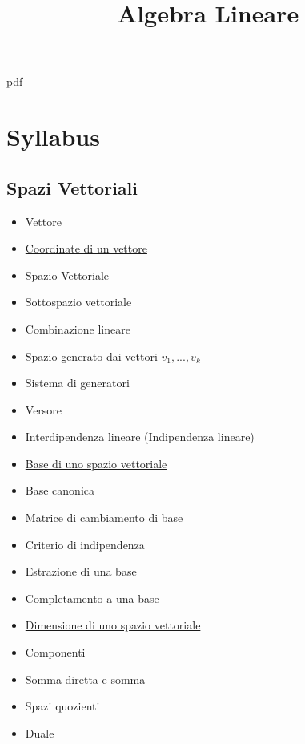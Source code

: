 \documentclass[a4paper,10pt]{article}
\title{Algebra Lineare}
\begin{document}
\maketitle
\href{AlgebraLineare.pdf}{pdf} 
\section*{Syllabus}
\subsection{Spazi Vettoriali}
\begin{itemize}
 \item Vettore
 \item \href{CoordinateVettore.pdf}{Coordinate di un vettore}
 \item \href{SpazioVettoriale.pdf}{Spazio Vettoriale}
 \item Sottospazio vettoriale
 \item Combinazione lineare
 \item Spazio generato dai vettori $v_1, ..., v_k$
 \item Sistema di generatori
 \item Versore
 \item Interdipendenza lineare (Indipendenza lineare)
 \item \href{Base.pdf}{Base di uno spazio vettoriale}
 \item Base canonica
 \item Matrice di cambiamento di base
 \item Criterio di indipendenza
 \item Estrazione di una base
 \item Completamento a una base
 \item \href{Dimensione.pdf}{Dimensione di uno spazio vettoriale}
 \item Componenti
 \item Somma diretta e somma 
 \item Spazi quozienti
 \item Duale
\end{itemize}
\end{document}
